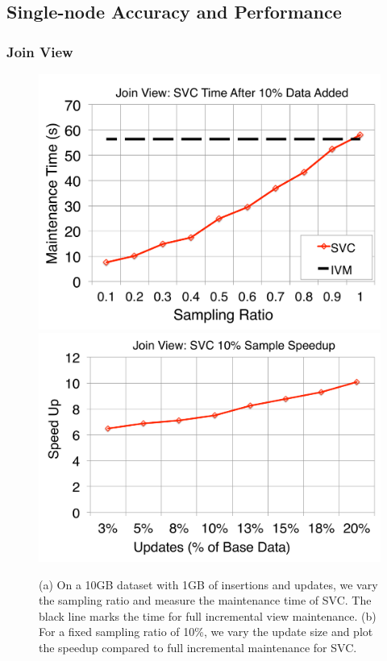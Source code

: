 \subsection{Single-node Accuracy and Performance}

\subsubsection{Join View}

\begin{figure}[t]
\centering
\includegraphics[scale=0.25]{exp/msj_1.pdf}
\includegraphics[scale=0.25]{exp/msj_2.pdf}
 \caption{(a) On a 10GB dataset with 1GB of insertions and updates, we vary the sampling ratio and measure the maintenance time of SVC. The black line marks the time for full incremental view maintenance. (b) For a fixed sampling ratio of 10\%, we vary the update size and plot the speedup compared to full incremental maintenance for SVC. \label{exp-1-samplesize}}
\end{figure}

